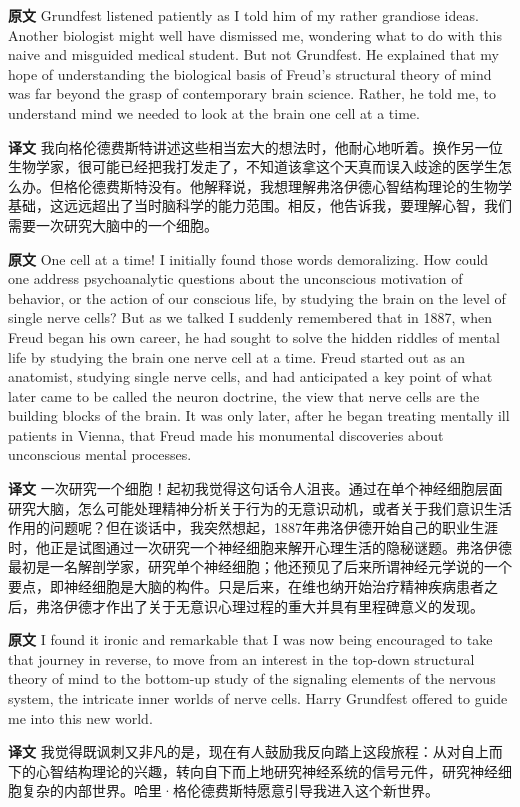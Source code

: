 \documentclass[UTF8,zihao=-4]{ctexart}
\newcommand{\BodyFont}{\fontsize{10.5pt}{15.5pt}\selectfont}
\newcommand{\origlabel}{\textbf{原文}\quad}
\newcommand{\translabel}{\textbf{译文}\quad}
\newenvironment{enblock}{\par\noindent\begingroup\BodyFont\origlabel}{\par\endgroup}
\newenvironment{zhblock}{\par\noindent\begingroup\BodyFont\translabel}{\par\endgroup\vspace{0.35em}}
\begin{document}
\begin{enblock}
Grundfest listened patiently as I told him of my rather grandiose ideas. Another biologist might well have dismissed me, wondering what to do with this naive and misguided medical student. But not Grundfest. He explained that my hope of understanding the biological basis of Freud's structural theory of mind was far beyond the grasp of contemporary brain science. Rather, he told me, to understand mind we needed to look at the brain one cell at a time.
\end{enblock}
\begin{zhblock}
我向格伦德费斯特讲述这些相当宏大的想法时，他耐心地听着。换作另一位生物学家，很可能已经把我打发走了，不知道该拿这个天真而误入歧途的医学生怎么办。但格伦德费斯特没有。他解释说，我想理解弗洛伊德心智结构理论的生物学基础，这远远超出了当时脑科学的能力范围。相反，他告诉我，要理解心智，我们需要一次研究大脑中的一个细胞。\end{zhblock}

\begin{enblock}
One cell at a time! I initially found those words demoralizing. How could one address psychoanalytic questions about the unconscious motivation of behavior, or the action of our conscious life, by studying the brain on the level of single nerve cells? But as we talked I suddenly remembered that in 1887, when Freud began his own career, he had sought to solve the hidden riddles of mental life by studying the brain one nerve cell at a time. Freud started out as an anatomist, studying single nerve cells, and had anticipated a key point of what later came to be called the neuron doctrine, the view that nerve cells are the building blocks of the brain. It was only later, after he began treating mentally ill patients in Vienna, that Freud made his monumental discoveries about unconscious mental processes.
\end{enblock}
\begin{zhblock}
一次研究一个细胞！起初我觉得这句话令人沮丧。通过在单个神经细胞层面研究大脑，怎么可能处理精神分析关于行为的无意识动机，或者关于我们意识生活作用的问题呢？但在谈话中，我突然想起，1887年弗洛伊德开始自己的职业生涯时，他正是试图通过一次研究一个神经细胞来解开心理生活的隐秘谜题。弗洛伊德最初是一名解剖学家，研究单个神经细胞；他还预见了后来所谓神经元学说的一个要点，即神经细胞是大脑的构件。只是后来，在维也纳开始治疗精神疾病患者之后，弗洛伊德才作出了关于无意识心理过程的重大并具有里程碑意义的发现。\end{zhblock}

\begin{enblock}
I found it ironic and remarkable that I was now being encouraged to take that journey in reverse, to move from an interest in the top-down structural theory of mind to the bottom-up study of the signaling elements of the nervous system, the intricate inner worlds of nerve cells. Harry Grundfest offered to guide me into this new world.
\end{enblock}
\begin{zhblock}
我觉得既讽刺又非凡的是，现在有人鼓励我反向踏上这段旅程：从对自上而下的心智结构理论的兴趣，转向自下而上地研究神经系统的信号元件，研究神经细胞复杂的内部世界。哈里·格伦德费斯特愿意引导我进入这个新世界。\end{zhblock}
\end{document}
